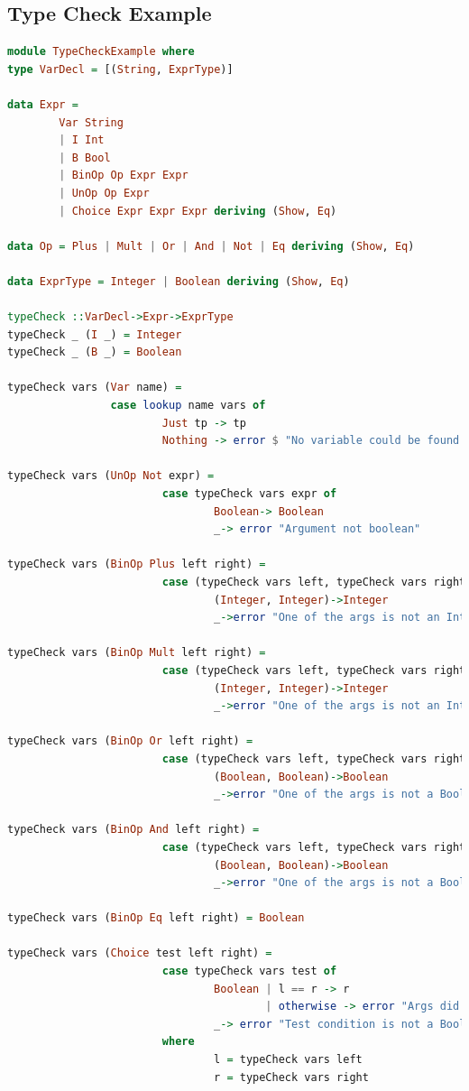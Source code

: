 \documentclass{article}
\begin{document}
    \subsection{Type Check Example}
    \begin{lstlisting}[language=Haskell]
module TypeCheckExample where
type VarDecl = [(String, ExprType)]

data Expr = 
        Var String
        | I Int
        | B Bool
        | BinOp Op Expr Expr
        | UnOp Op Expr
        | Choice Expr Expr Expr deriving (Show, Eq)
            
data Op = Plus | Mult | Or | And | Not | Eq deriving (Show, Eq)

data ExprType = Integer | Boolean deriving (Show, Eq)

typeCheck ::VarDecl->Expr->ExprType
typeCheck _ (I _) = Integer
typeCheck _ (B _) = Boolean

typeCheck vars (Var name) = 
                case lookup name vars of
                        Just tp -> tp
                        Nothing -> error $ "No variable could be found named "++name

typeCheck vars (UnOp Not expr) = 
                        case typeCheck vars expr of
                                Boolean-> Boolean 
                                _-> error "Argument not boolean"

typeCheck vars (BinOp Plus left right) = 
                        case (typeCheck vars left, typeCheck vars right) of
                                (Integer, Integer)->Integer
                                _->error "One of the args is not an Integer"

typeCheck vars (BinOp Mult left right) = 
                        case (typeCheck vars left, typeCheck vars right) of
                                (Integer, Integer)->Integer
                                _->error "One of the args is not an Integer"

typeCheck vars (BinOp Or left right) = 
                        case (typeCheck vars left, typeCheck vars right) of
                                (Boolean, Boolean)->Boolean
                                _->error "One of the args is not a Boolean"

typeCheck vars (BinOp And left right) = 
                        case (typeCheck vars left, typeCheck vars right) of
                                (Boolean, Boolean)->Boolean
                                _->error "One of the args is not a Boolean"

typeCheck vars (BinOp Eq left right) = Boolean

typeCheck vars (Choice test left right) = 
                        case typeCheck vars test of
                                Boolean | l == r -> r
                                        | otherwise -> error "Args did not match"
                                _-> error "Test condition is not a Boolean"
                        where
                                l = typeCheck vars left
                                r = typeCheck vars right
    \end{lstlisting}
\end{document}
